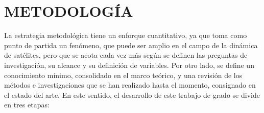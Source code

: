 %
%
%
%
%


\newpage
\section{METODOLOGÍA}

La estrategia metodológica tiene un enforque cuantitativo, ya que toma como punto de partida un fenómeno, que puede ser amplio en el campo de la dinámica de satélites, pero que se acota cada vez más según se definen las preguntas de investigación, su alcance y su definición de variables. Por otro lado, se define un conocimiento mínimo, consolidado en el marco teórico, y una revisión de los métodos e investigaciones que se han realizado hasta el momento, consignado en el estado del arte.
En este sentido, el desarrollo de este trabajo de grado se divide en tres etapas:
